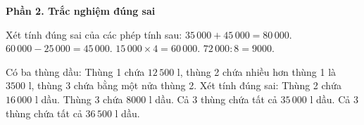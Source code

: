 \textbf{Phần 2. Trắc nghiệm đúng sai}

\begin{ex} %
Xét tính đúng sai của các phép tính sau:
\choiceTF
{\True $35\,000 + 45\,000 = 80\,000$.}
{$60\,000 - 25\,000 = 45\,000$.}
{\True $15\,000 \times 4 = 60\,000$.}
{\True $72\,000 : 8 = 9000$.}
\end{ex}

\begin{ex} %
Có ba thùng dầu: Thùng 1 chứa $12\,500\text{ l}$, thùng 2 chứa nhiều hơn thùng 1 là $3500\text{ l}$, thùng 3 chứa bằng một nửa thùng 2. Xét tính đúng sai:
\choiceTF
{\True Thùng 2 chứa $16\,000\text{ l}$ dầu.}
{\True Thùng 3 chứa $8000\text{ l}$ dầu.}
{Cả 3 thùng chứa tất cả $35\,000\text{ l}$ dầu.}
{\True Cả 3 thùng chứa tất cả $36\,500\text{ l}$ dầu.}
\end{ex}

